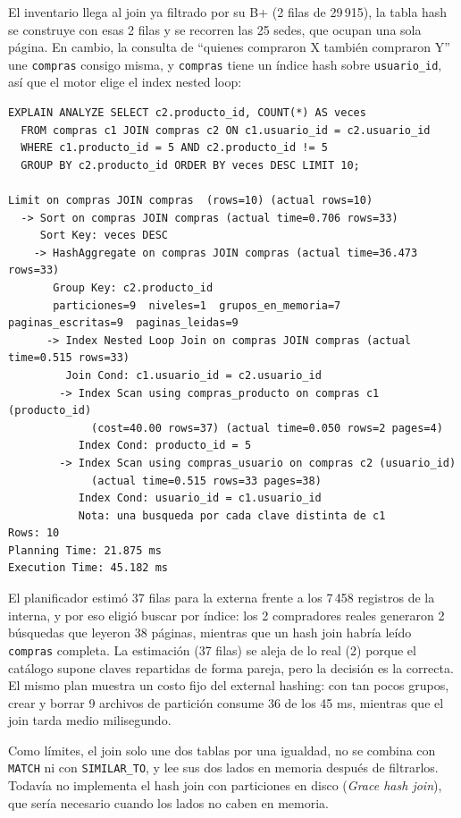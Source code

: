 \documentclass[11pt,a4paper]{article}
\begin{document}
El inventario llega al join ya filtrado por su B+ (2 filas de 29\,915), la tabla hash se construye con esas 2 filas y se recorren las 25 sedes, que ocupan una sola página. En cambio, la consulta de ``quienes compraron X también compraron Y'' une \texttt{compras} consigo misma, y \texttt{compras} tiene un índice hash sobre \texttt{usuario\_id}, así que el motor elige el index nested loop:

\begin{lstlisting}
EXPLAIN ANALYZE SELECT c2.producto_id, COUNT(*) AS veces
  FROM compras c1 JOIN compras c2 ON c1.usuario_id = c2.usuario_id
  WHERE c1.producto_id = 5 AND c2.producto_id != 5
  GROUP BY c2.producto_id ORDER BY veces DESC LIMIT 10;

Limit on compras JOIN compras  (rows=10) (actual rows=10)
  -> Sort on compras JOIN compras (actual time=0.706 rows=33)
     Sort Key: veces DESC
    -> HashAggregate on compras JOIN compras (actual time=36.473 rows=33)
       Group Key: c2.producto_id
       particiones=9  niveles=1  grupos_en_memoria=7  paginas_escritas=9  paginas_leidas=9
      -> Index Nested Loop Join on compras JOIN compras (actual time=0.515 rows=33)
         Join Cond: c1.usuario_id = c2.usuario_id
        -> Index Scan using compras_producto on compras c1 (producto_id)
             (cost=40.00 rows=37) (actual time=0.050 rows=2 pages=4)
           Index Cond: producto_id = 5
        -> Index Scan using compras_usuario on compras c2 (usuario_id)
             (actual time=0.515 rows=33 pages=38)
           Index Cond: usuario_id = c1.usuario_id
           Nota: una busqueda por cada clave distinta de c1
Rows: 10
Planning Time: 21.875 ms
Execution Time: 45.182 ms
\end{lstlisting}

El planificador estimó 37 filas para la externa frente a los 7\,458 registros de la interna, y por eso eligió buscar por índice: los 2 compradores reales generaron 2 búsquedas que leyeron 38 páginas, mientras que un hash join habría leído \texttt{compras} completa. La estimación (37 filas) se aleja de lo real (2) porque el catálogo supone claves repartidas de forma pareja, pero la decisión es la correcta. El mismo plan muestra un costo fijo del external hashing: con tan pocos grupos, crear y borrar 9 archivos de partición consume 36 de los 45 ms, mientras que el join tarda medio milisegundo.

Como límites, el join solo une dos tablas por una igualdad, no se combina con \texttt{MATCH} ni con \texttt{SIMILAR\_TO}, y lee sus dos lados en memoria después de filtrarlos. Todavía no implementa el hash join con particiones en disco (\emph{Grace hash join}), que sería necesario cuando los lados no caben en memoria.
\end{document}
